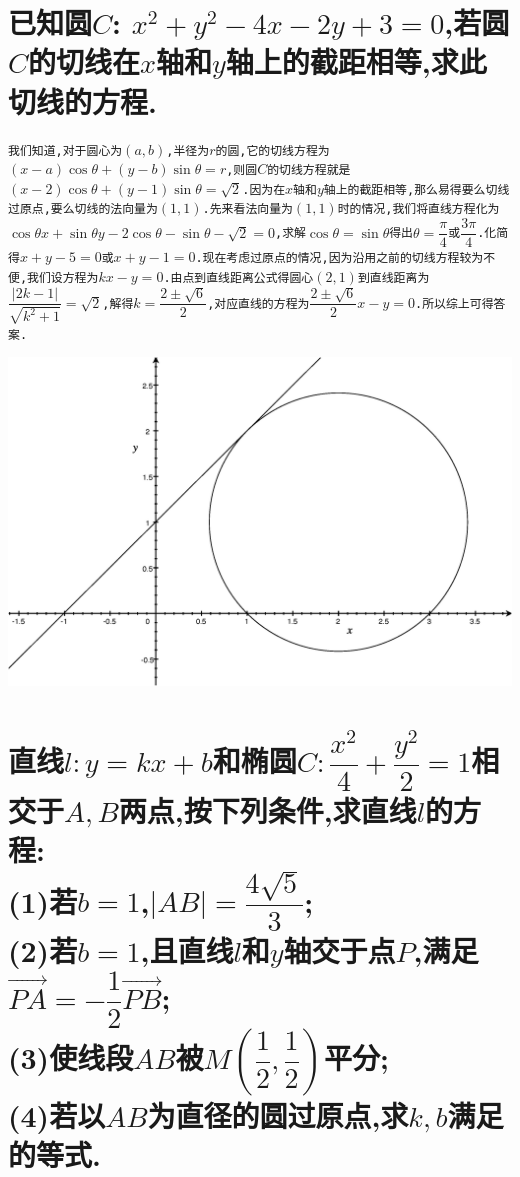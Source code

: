 \documentclass{article}
\newcommand{\1}{\underline{\makebox[1cm]{}}}
\newcommand{\2}{\underline{\makebox[2cm]{}}}
\newcommand{\3}{\underline{\makebox[3cm]{}}}
\newcommand{\4}{\underline{\makebox[4cm]{}}}
\newcommand{\lge}{\large \texttt}
\newcommand{\xl}{\overrightarrow}
\newlength{\la}
\begin{document}
\section{已知圆$C$: $x^2+y^2-4x-2y+3=0$,若圆$C$的切线在$x$轴和$y$轴上的截距相等,求此切线的方程.}
\begin{minipage}[b]{0.6\linewidth}
    \lge{我们知道,对于圆心为$(a,b)$,半径为$r$的圆,它的切线方程为$(x-a)\cos\theta+(y-b)\sin\theta=r$,则圆$C$的切线方程就是$(x-2)\cos\theta+(y-1)\sin\theta=\sqrt{2}$.因为在$x$轴和$y$轴上的截距相等,那么易得要么切线过原点,要么切线的法向量为$(1,1)$.先来看法向量为$(1,1)$时的情况,我们将直线方程化为$\cos\theta x+\sin\theta y-2\cos\theta-\sin\theta-\sqrt{2}=0$,求解$\cos\theta=\sin\theta$得出$\theta =\dfrac{\pi}{4}$或$\dfrac{3\pi}{4}$.化简得$x+y-5=0$或$x+y-1=0$.现在考虑过原点的情况,因为沿用之前的切线方程较为不便,我们设方程为$kx-y=0$.由点到直线距离公式得圆心$(2,1)$到直线距离为$\dfrac{|2k-1|}{\sqrt{k^2+1}}=\sqrt{2}$,解得$k=\dfrac{2\pm \sqrt{6}}{2}$,对应直线的方程为$\dfrac{2\pm \sqrt{6}}{2}x-y=0$.所以综上可得答案.}
    \end{minipage}
    \hfill
    \begin{minipage}[b]{0.35\linewidth}
    \includegraphics[height=7\baselineskip]{41.eps}
\end{minipage}

\section{直线$l:y=kx+b$和椭圆$C:\dfrac{x^2}{4}+\dfrac{y^2}{2}=1$相交于$A,B$两点,按下列条件,求直线$l$的方程:\\(1)若$b=1$,$|AB|=\dfrac{4\sqrt{5}}{3}$;\\(2)若$b=1$,且直线$l$和$y$轴交于点$P$,满足$\xl{PA}=-\dfrac{1}{2}\xl{PB}$;\\(3)使线段$AB$被$M( \dfrac{1}{2},\dfrac{1}{2})$平分;\\(4)若以$AB$为直径的圆过原点,求$k,b$满足的等式.}
\lge{}
\end{document}
